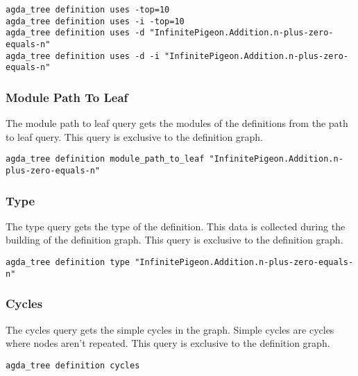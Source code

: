 \noindent
\begin{minipage}{\textwidth}
\begin{lstlisting}
agda_tree definition uses -top=10
agda_tree definition uses -i -top=10
agda_tree definition uses -d "InfinitePigeon.Addition.n-plus-zero-equals-n"
agda_tree definition uses -d -i "InfinitePigeon.Addition.n-plus-zero-equals-n"
\end{lstlisting}
\end{minipage}

\subsubsection{Module Path To Leaf}

The module path to leaf query gets the modules of the definitions from the path
to leaf query. This query is exclusive to the definition graph.

\noindent
\begin{minipage}{\textwidth}
\begin{lstlisting}
agda_tree definition module_path_to_leaf "InfinitePigeon.Addition.n-plus-zero-equals-n"
\end{lstlisting}
\end{minipage}

\subsubsection{Type}

The type query gets the type of the definition. This data is collected during
the building of the definition graph. This query is exclusive to the definition
graph. 

\noindent
\begin{minipage}{\textwidth}
\begin{lstlisting}
agda_tree definition type "InfinitePigeon.Addition.n-plus-zero-equals-n"
\end{lstlisting}
\end{minipage}

\subsubsection{Cycles}

The cycles query gets the simple cycles in the graph. Simple cycles are cycles
where nodes aren't repeated. This query is exclusive to the definition graph. 

\noindent
\begin{minipage}{\textwidth}
\begin{lstlisting}
agda_tree definition cycles
\end{lstlisting}
\end{minipage}

